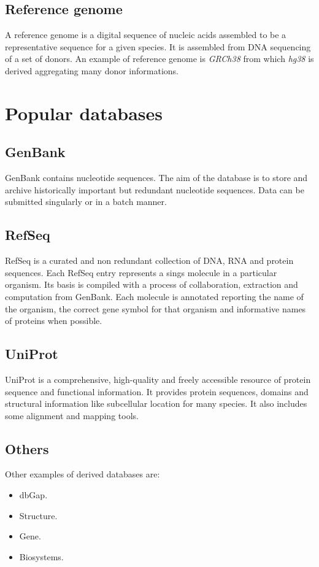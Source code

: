 	\subsection{Reference genome}
	A reference genome is a digital sequence of nucleic acids assembled to be a representative sequence for a given species.
	It is assembled from DNA sequencing of a set of donors.
	An example of reference genome is \emph{GRCh38} from which \emph{hg38} is derived aggregating many donor informations.

\section{Popular databases}

	\subsection{GenBank}
	GenBank contains nucleotide sequences.
	The aim of the database is to store and archive historically important but redundant nucleotide sequences.
	Data can be submitted singularly or in a batch manner.

	\subsection{RefSeq}
	RefSeq is a curated and non redundant collection of DNA, RNA and protein sequences.
	Each RefSeq entry represents a sings molecule in a particular organism.
	Its basis is compiled with a process of collaboration, extraction and computation from GenBank.
	Each molecule is annotated reporting the name of the organism, the correct gene symbol for that organism and informative names of proteins when possible.

	\subsection{UniProt}
	UniProt is a comprehensive, high-quality and freely accessible resource of protein sequence and functional information.
	It provides protein sequences, domains and structural information like subcellular location for many species.
	It also includes some alignment and mapping tools.

	\subsection{Others}
	Other examples of derived databases are:

	\begin{multicols}{4}
		\begin{itemize}
			\item dbGap.
			\item Structure.
			\item Gene.
			\item Biosystems.
		\end{itemize}
	\end{multicols}

